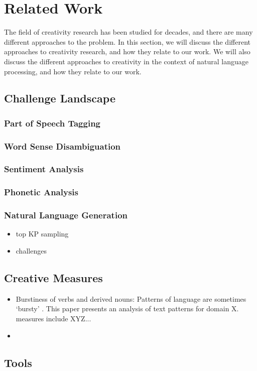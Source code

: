 \chapter{Related Work}
\label{chap:background}
The field of creativity research has been studied for decades, and there are many different approaches to the problem. In this section, we will discuss the different approaches to creativity research, and how they relate to our work. We will also discuss the different approaches to creativity in the context of natural language processing, and how they relate to our work.

\section{Challenge Landscape}

\subsection{Part of Speech Tagging}

\subsection{Word Sense Disambiguation}

\subsection{Sentiment Analysis}

\subsection{Phonetic Analysis}

\subsection{Natural Language Generation}
\begin{itemize}
    \item top KP sampling
    \item challenges 
\end{itemize}


\section{Creative Measures}
\begin{itemize}
    \item Burstiness of verbs and derived nouns: Patterns of language are sometimes `bursty' \cite{pierrehumbert_burstiness_2012}. This paper presents an analysis of text patterns for domain X. measures include XYZ...
    \item 
\end{itemize}

\section{Tools}
